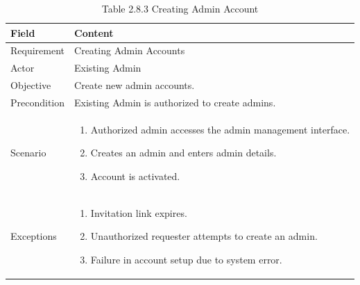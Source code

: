 \documentclass[12pt,oneside]{report}
\begin{document}
\begin{table}[H]
\centering
\caption{Table 2.8.3 Creating Admin Account}
\label{tab:admin-create-account}
\begin{tabularx}{\textwidth}{|p{3cm}|X|}
\hline
\textbf{Field} & \textbf{Content} \\ \hline

Requirement & Creating Admin Accounts \\ \hline

Actor & Existing Admin \\ \hline

Objective & Create new admin accounts. \\ \hline

Precondition & Existing Admin is authorized to create admins. \\ \hline

Scenario & 
\begin{minipage}[t]{0.75\textwidth}
\begin{enumerate}[leftmargin=*,label=\arabic*.]
\item Authorized admin accesses the admin management interface.
\item Creates an admin and enters admin details.
\item Account is activated.
\end{enumerate}
\end{minipage} \\ \hline

Exceptions &
\begin{minipage}[t]{0.75\textwidth}
\begin{enumerate}[leftmargin=*,label=\arabic*.]
\item Invitation link expires.
\item Unauthorized requester attempts to create an admin.
\item Failure in account setup due to system error.
\end{enumerate}
\end{minipage} \\ \hline

\end{tabularx}
\end{table}
\end{document}
